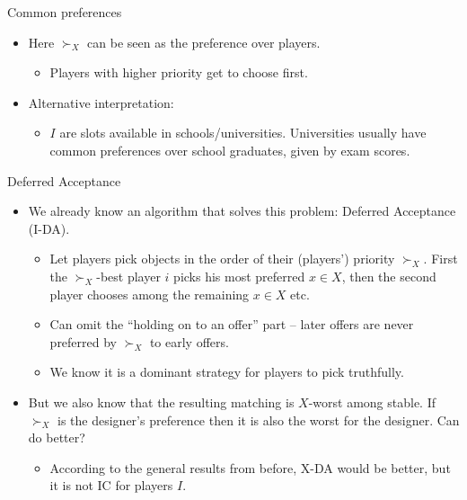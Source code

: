 \documentclass[english,10pt
,aspectratio=169
]{beamer}
\begin{document}
\begin{frame}{Common preferences}
\begin{itemize}
	\item Here $\succ_X$ can be seen as the  preference over players.
	\begin{itemize}
		\item Players with higher priority get to choose first.
	\end{itemize}
	\item Alternative interpretation:
	\begin{itemize}
		\item $I$ are slots available in schools/universities. Universities usually have common preferences over school graduates, given by exam scores.
	\end{itemize}
\end{itemize}
\end{frame}


\begin{frame}{Deferred Acceptance}
\begin{itemize}
	\item We already know an algorithm that solves this problem: Deferred Acceptance (I-DA).
	\begin{itemize}
		\item Let players pick objects in the order of their (players') priority $\succ_X$. First the $\succ_X$-best player $i$ picks his most preferred $x \in X$, then the second player chooses among the remaining $x \in X$ etc.
		\item Can omit the ``holding on to an offer'' part -- later offers are never preferred by $\succ_X$ to early offers.
		\item We know it is a dominant strategy for players to pick truthfully.
	\end{itemize}
	\item But we also know that the resulting matching is $X$-worst among stable. If $\succ_X$ is the designer's preference then it is also the worst for the designer. Can do better?
	\begin{itemize}
		\item According to the general results from before, X-DA would be better, but it is not IC for players $I$.
	\end{itemize}
\end{itemize}
\end{frame}
\end{document}
